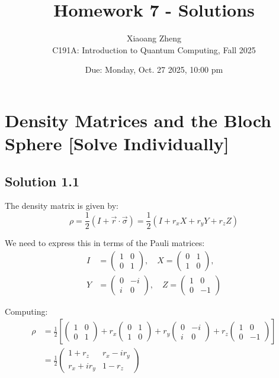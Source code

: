 \documentclass[11pt]{article}
\title{Homework 7 - Solutions}
\author{Xiaoang Zheng \\ C191A: Introduction to Quantum Computing, Fall 2025}
\date{Due: Monday, Oct. 27 2025, 10:00 pm}
\begin{document}
\maketitle

\clearpage

\section{Density Matrices and the Bloch Sphere [Solve Individually]}

\subsection{Solution 1.1}

The density matrix is given by:
\begin{equation*}
    \rho = \frac{1}{2}(I + \vec{r} \cdot \vec{\sigma}) = \frac{1}{2}(I + r_x X + r_y Y + r_z Z)
\end{equation*}

We need to express this in terms of the Pauli matrices:
\begin{align*}
    I &= \begin{pmatrix} 1 & 0 \\ 0 & 1 \end{pmatrix}, \quad
    X = \begin{pmatrix} 0 & 1 \\ 1 & 0 \end{pmatrix}, \\
    Y &= \begin{pmatrix} 0 & -i \\ i & 0 \end{pmatrix}, \quad
    Z = \begin{pmatrix} 1 & 0 \\ 0 & -1 \end{pmatrix}
\end{align*}

Computing:
\begin{align*}
    \rho &= \frac{1}{2}\left[\begin{pmatrix} 1 & 0 \\ 0 & 1 \end{pmatrix} + r_x \begin{pmatrix} 0 & 1 \\ 1 & 0 \end{pmatrix} + r_y \begin{pmatrix} 0 & -i \\ i & 0 \end{pmatrix} + r_z \begin{pmatrix} 1 & 0 \\ 0 & -1 \end{pmatrix}\right] \\
    &= \frac{1}{2}\begin{pmatrix} 1 + r_z & r_x - ir_y \\ r_x + ir_y & 1 - r_z \end{pmatrix}
\end{align*}
\end{document}
